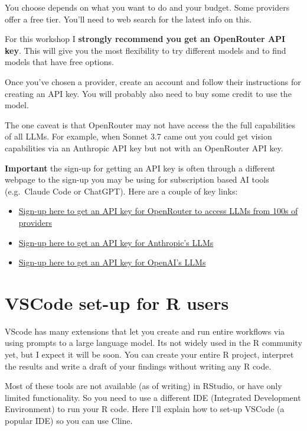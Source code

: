 \documentclass[
  letterpaper,
  DIV=11,
  numbers=noendperiod]{scrreprt}
\providecommand{\tightlist}{%
  \setlength{\itemsep}{0pt}\setlength{\parskip}{0pt}}\usepackage{longtable,booktabs,array}
\begin{document}
You choose depends on what you want to do and your budget. Some
providers offer a free tier. You'll need to web search for the latest
info on this.

For this workshop I \textbf{strongly recommend you get an OpenRouter API
key}. This will give you the most flexibility to try different models
and to find models that have free options.

Once you've chosen a provider, create an account and follow their
instructions for creating an API key. You will probably also need to buy
some credit to use the model.

The one caveat is that OpenRouter may not have access the the full
capabilities of all LLMs. For example, when Sonnet 3.7 came out you
could get vision capabilities via an Anthropic API key but not with an
OpenRouter API key.

\textbf{Important} the sign-up for getting an API key is often through a
different webpage to the sign-up you may be using for subscription based
AI tools (e.g.~Claude Code or ChatGPT). Here are a couple of key links:

\begin{itemize}
\tightlist
\item
  \href{https://accounts.openrouter.ai/sign-up}{Sign-up here to get an
  API key for OpenRouter to access LLMs from 100s of providers}
\item
  \href{https://console.anthropic.com/login}{Sign-up here to get an API
  key for Anthropic's LLMs}
\item
  \href{https://auth.openai.com/log-in}{Sign-up here to get an API key
  for OpenAI's LLMs}
\end{itemize}

\section{VSCode set-up for R users}\label{sec-vscodesetup}

VScode has many extensions that let you create and run entire workflows
via using prompts to a large language model. Its not widely used in the
R community yet, but I expect it will be soon. You can create your
entire R project, interpret the results and write a draft of your
findings without writing any R code.

Most of these tools are not available (as of writing) in RStudio, or
have only limited functionality. So you need to use a different IDE
(Integrated Development Environment) to run your R code. Here I'll
explain how to set-up VSCode (a popular IDE) so you can use Cline.
\end{document}
